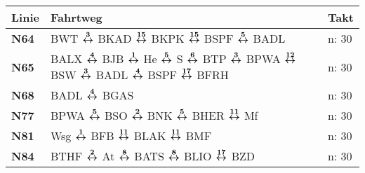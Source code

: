 \begin{minipage}[t]{0.05\textwidth}
\phantom{Tor}
\end{minipage}
\begin{minipage}[t]{0.45\textwidth}
\begin{tabular}{>{\bfseries}L{1.2cm}L{9.0cm}L{3.0cm}}
{\bfseries Linie} & {\bfseries Fahrtweg} & {\bfseries Takt} \\
\hline
\nbus{} N64   & BWT $\xarwe{3}$ BKAD $\xarwe{15}$ BKPK $\xarwe{15}$ BSPF $\xarwe{5}$ BADL & n: 30 \\
\nbus{} N65   & BALX $\xarwe{4}$ BJB $\xarwe{1}$ He $\xarwe{5}$ S $\xarwe{6}$ BTP $\xarwe{3}$ BPWA $\xarwe{12}$ BSW $\xarwe{3}$ BADL
$\xarwe{4}$ BSPF $\xarwe{17}$ BFRH & n: 30                      \\
\nbus{} N68   & BADL $\xarwe{4}$ BGAS                                                                                                                                               & n: 30                      \\
\nbus{} N77   & BPWA $\xarwe{5}$ BSO $\xarwe{2}$ BNK $\xarwe{5}$ BHER $\xarwe{11}$ Mf                                                                                               & n: 30                      \\
\nbus{} N81   & Wsg $\xarwe{1}$ BFB $\xarwe{11}$ BLAK $\xarwe{11}$ BMF                                                                                                              & n: 30                      \\
\nbus{} N84   & BTHF $\xarwe{2}$ At $\xarwe{8}$ BATS $\xarwe{8}$ BLIO $\xarwe{17}$ BZD                                                                                              & n: 30                      \\
\hline
\end{tabular}
\end{minipage}
